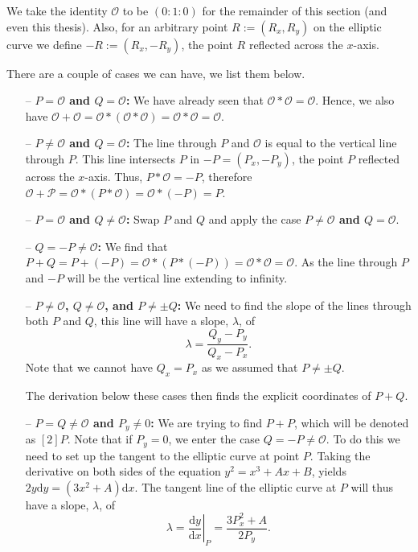 \documentclass[openany, a4paper, 10pt]{book}
\theoremstyle{plain}
\theoremstyle{plain}
\theoremstyle{plain}
\theoremstyle{definition}
\theoremstyle{plain}
\theoremstyle{definition}
\theoremstyle{remark}
\begin{document}
We take the identity $\mathcal O$ to be $(0:1:0)$ for the remainder of this section (and even this thesis).
Also, for an arbitrary point $R:= (R_x, R_y)$ on the elliptic curve we define $-R:= (R_x, -R_y)$, the point $R$ reflected across the $x$-axis.

There are a couple of cases we can have, we list them below.
\begin{itemize}
    \item[--] \textbf{$P=\mathcal O$ and $Q=\mathcal O$:}
        We have already seen that
        $\mathcal O * \mathcal O = \mathcal O$.
        Hence, we also have
        $\mathcal O + \mathcal O = \mathcal O * (\mathcal O * \mathcal O) = \mathcal O * \mathcal O = \mathcal O$.
    \item[--] \textbf{$P\neq\mathcal O$ and $Q=\mathcal O$:}
        The line through $P$ and $\mathcal O$ is equal to the vertical line through $P$.
        This line intersects $P$ in $-P=(P_x, -P_y)$, the point $P$ reflected across the $x$-axis.
        Thus, $P * \mathcal O = -P$, therefore $\mathcal O + \mathcal P = \mathcal O * (P * \mathcal O) = \mathcal O * (-P) = P$.
    \item[--] \textbf{$P=\mathcal O$ and $Q\neq\mathcal O$:}
        Swap $P$ and $Q$ and apply the case \textbf{$P\neq\mathcal O$ and $Q=\mathcal O$}.
    \item[--] \textbf{$Q = -P\neq\mathcal O$:}
        We find that $P + Q = P + (-P) = \mathcal O * (P * (-P)) = \mathcal O * \mathcal O = \mathcal O$.
        As the line through $P$ and $-P$ will be the vertical line extending to infinity.
    \item[--] \textbf{$P\neq\mathcal O$, $Q\neq\mathcal O$, and $P \neq \pm Q$:}
        We need to find the slope of the lines through
        both $P$ and $Q$, this line will have a slope, $\lambda$, of
        \begin{equation*}
            \lambda = \frac{Q_y-P_y}{Q_x-P_x}.
        \end{equation*}
        Note that we cannot have $Q_x = P_x$ as we assumed that $P\neq \pm Q$.

        The derivation below these cases then finds the explicit coordinates of $P+Q$.
    \item[--] \textbf{$P=Q\neq\mathcal O$ and $P_y \neq 0$:}
        We are trying to find $P+P$, which will be denoted as $[2]P$.
        Note that if $P_y=0$, we enter the case $Q=-P \neq \mathcal O$.
        To do this we need to set up the tangent to the elliptic curve at point $P$.
        Taking the derivative on both sides of the equation $y^2=x^3+Ax+B$, yields $2y\mathrm dy = (3x^2+A)\mathrm dx$.
        The tangent line of the elliptic curve at $P$ will thus have a slope, $\lambda$, of
        \begin{equation*}
            \lambda =
            \left. \frac{\mathrm dy}{\mathrm dx} \right|_{P} =
            \frac{3P_x^2 + A}{2P_y}.
        \end{equation*}
\end{itemize}
\end{document}
